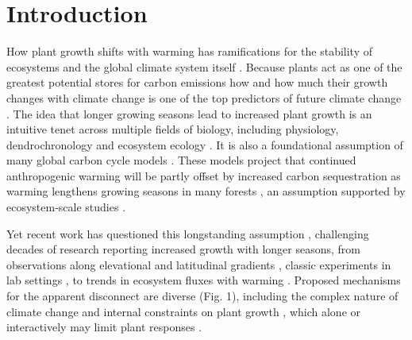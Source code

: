 \documentclass[11pt]{article}
\begin{document}
\section*{Introduction} 

How plant growth shifts with warming has ramifications for the stability of ecosystems and the global climate system itself \citep{ipcc2021}. Because plants act as one of the greatest potential stores for carbon emissions how and how much their growth changes with climate change is one of the top predictors of future climate change \citep{ipcc2021,friedlingstein2022global}. The idea that longer growing seasons lead to increased plant growth is an intuitive tenet across multiple fields of biology, including physiology, dendrochronology and ecosystem ecology \citep{nobel1983biophysical,frank2022dendrochronology}. It is also a foundational assumption of many global carbon cycle models \citep[e.g.][]{ito2020global,friedlingstein2022global}. These models project that continued anthropogenic warming will be partly offset by increased carbon sequestration as warming lengthens growing seasons in many forests \citep{friedlingstein2022global}, an assumption supported by ecosystem-scale studies \citep{chen1999effects,keenan2014net,finzi2020}. 

Yet recent work has questioned this longstanding assumption \citep[e.g.][]{dow2022warm,green2022limits,silvestro2023longer}, challenging decades of research reporting increased growth with longer seasons, from observations along elevational and latitudinal gradients \citep[][]{myneni1997increased,berdanier2011growing,king2013tree,cuapio2022there}, classic experiments in lab settings \citep{went1957experimental}, to trends in ecosystem fluxes with warming \citep{chen1999effects,keenan2014net,finzi2020}. Proposed mechanisms for the apparent disconnect are diverse (Fig. 1), including the complex nature of climate change \citep[e.g. drought or heat stress,][]{dow2022warm} and internal constraints on plant growth \citep{zohner2023effect}, which alone or interactively may limit plant responses \citep{korner2015paradigm}. 
\end{document}
